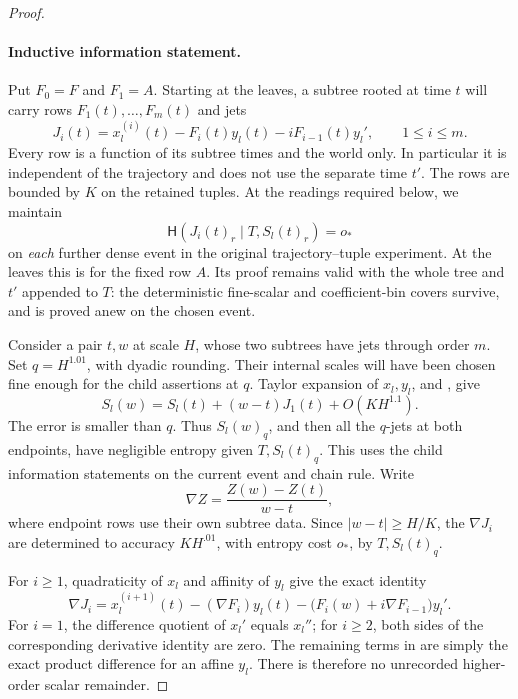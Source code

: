 \begin{proof}
\paragraph{Inductive information statement.}
Put \(F_0=F\) and \(F_1=A\).
Starting at the leaves, a subtree rooted at time \(t\) will carry rows
\(F_1(t),\ldots,F_m(t)\) and jets
\begin{equation}\label{a04:jet-definition}
 J_i(t)=x_l^{(i)}(t)-F_i(t)y_l(t)-iF_{i-1}(t)y_l',
 \qquad 1\le i\le m.
\end{equation}
Every row is a function of its subtree times and the world only.
In particular it is independent of the trajectory and does not use
the separate time \(t'\).  The rows are bounded by \(K\) on the retained
tuples.
At the readings required below, we maintain
\begin{equation}\label{a04:hereditary-jets}
 \mathsf H(J_i(t)_r\mid T,S_l(t)_r)=o_*
\end{equation}
on \emph{each} further dense event in the original trajectory--tuple
experiment.  At the leaves this is
 for the fixed row \(A\).
Its proof remains valid with the whole tree and \(t'\) appended to
\(T\): the deterministic fine-scalar and coefficient-bin covers
survive, and  is proved anew on the chosen event.

Consider a pair \(t,w\) at scale \(H\), whose two subtrees have jets
through order \(m\).  Set \(q=H^{1.01}\), with dyadic rounding.
Their internal scales will have been chosen fine enough for the
child assertions at \(q\).
Taylor expansion of \(x_l,y_l\), and , give
\begin{equation}\label{a04:scalar-first-expansion}
 S_l(w)=S_l(t)+(w-t)J_1(t)+O(KH^{1.1}).
\end{equation}
The error is smaller than \(q\).
Thus \(S_l(w)_q\), and then all the \(q\)-jets at both endpoints, have
negligible entropy given \(T,S_l(t)_q\).
This uses the child information statements on the current event and
chain rule.  Write
\[
 \nabla Z=\frac{Z(w)-Z(t)}{w-t},
\]
where endpoint rows use their own subtree data.
Since \(|w-t|\ge H/K\), the \(\nabla J_i\) are determined to accuracy
\(KH^{.01}\), with entropy cost \(o_*\), by \(T,S_l(t)_q\).

For \(i\ge1\), quadraticity of \(x_l\) and affinity of \(y_l\) give the
exact identity
\begin{equation}\label{a04:jet-difference}
 \nabla J_i
 =x_l^{(i+1)}(t)-(\nabla F_i)y_l(t)
       -\bigl(F_i(w)+i\nabla F_{i-1}\bigr)y_l'.
\end{equation}
For \(i=1\), the difference quotient of \(x_l'\) equals \(x_l''\);
for \(i\ge2\), both sides of the corresponding derivative identity
are zero.  The remaining terms in  are simply
the exact product difference for an affine \(y_l\).
There is therefore no unrecorded higher-order scalar remainder.


\end{proof}
